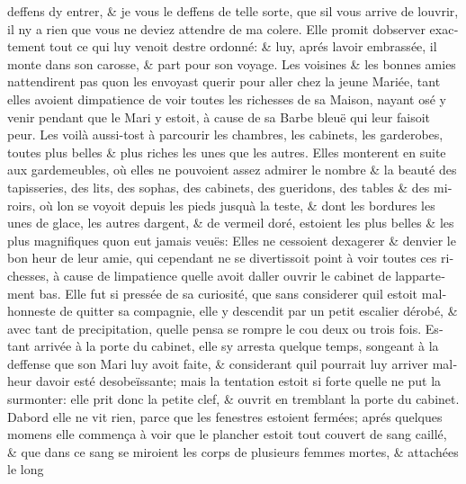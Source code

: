 \documentclass[14pt,a4paper]{memoir}
\begin{document}
{{\begin{otherlanguage}{french}
deffens d\textquotesingle y entrer, \& je vous le deffens de telle
sorte, que s\textquotesingle il vous arrive de l\textquotesingle ouvrir,
il n\textquotesingle y a rien que vous ne deviez attendre de ma colere.
Elle promit d\textquotesingle observer exactement tout ce qui luy venoit
d\textquotesingle estre ordonné: \& luy, aprés l\textquotesingle avoir
embrassée, il monte dans son carosse, \& part pour son voyage. Les
voisines \& les bonnes amies n\textquotesingle attendirent pas
qu\textquotesingle on les envoyast querir pour aller chez la jeune
Mariée, tant elles avoient d\textquotesingle impatience de voir toutes
les richesses de sa Maison, n\textquotesingle ayant osé y venir pendant
que le Mari y estoit, à cause de sa Barbe bleuë qui leur faisoit peur.
Les voilà aussi-tost à parcourir les chambres, les cabinets, les
garderobes, toutes plus belles \& plus riches les unes que les autres.
Elles monterent en suite aux gardemeubles, où elles ne pouvoient assez
admirer le nombre \& la beauté des tapisseries, des lits, des sophas,
des cabinets, des gueridons, des tables \& des miroirs, où
l\textquotesingle on se voyoit depuis les pieds jusqu\textquotesingle à
la teste, \& dont les bordures les unes de glace, les autres
d\textquotesingle argent, \& de vermeil doré, estoient les plus belles
\& les plus magnifiques qu\textquotesingle on eut jamais veuës: Elles ne
cessoient d\textquotesingle exagerer \& d\textquotesingle envier le bon
heur de leur amie, qui cependant ne se divertissoit point à voir toutes
ces richesses, à cause de l\textquotesingle impatience
qu\textquotesingle elle avoit d\textquotesingle aller ouvrir le cabinet
de l\textquotesingle appartement bas. Elle fut si pressée de sa
curiosité, que sans considerer qu\textquotesingle il estoit malhonneste
de quitter sa compagnie, elle y descendit par un petit escalier dérobé,
\& avec tant de precipitation, qu\textquotesingle elle pensa se rompre
le cou deux ou trois fois. Estant arrivée à la porte du cabinet, elle
s\textquotesingle y arresta quelque temps, songeant à la deffense que
son Mari luy avoit faite, \& considerant qu\textquotesingle il pourrait
luy arriver malheur d\textquotesingle avoir esté desobeïssante; mais la
tentation estoit si forte qu\textquotesingle elle ne put la surmonter:
elle prit donc la petite clef, \& ouvrit en tremblant la porte du
cabinet. D\textquotesingle abord elle ne vit rien, parce que les
fenestres estoient fermées; aprés quelques momens elle commença à voir
que le plancher estoit tout couvert de sang caillé, \& que dans ce sang
se miroient les corps de plusieurs femmes mortes, \& attachées le long

\end{otherlanguage}}}
\end{document}
